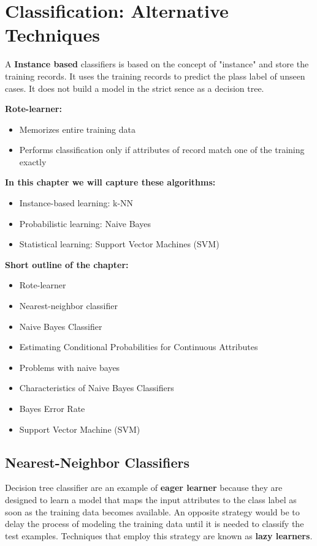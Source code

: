 \chapter{Classification: Alternative Techniques}
	
	A {\bf Instance based} classifiers is based on the concept of "instance" and store
	the training records. It uses the training records to predict the plass label
	of unseen cases. It does not build a model in the strict sence as a decision tree. 

	{\bf Rote-learner:}
	\begin{itemize}
		\item Memorizes entire training data
		\item Performs classification only if attributes of record match
		one of the training exactly
	\end{itemize}

	{\bf In this chapter we will capture these algorithms:} 
	\begin{itemize}
		\item Instance-based learning: k-NN
		\item Probabilistic learning: Naive Bayes
		\item Statistical learning: Support Vector Machines (SVM)
	\end{itemize}

	{\bf Short outline of the chapter:}

		\begin{itemize}
			\item Rote-learner
			\item Nearest-neighbor classifier
			\item Naive Bayes Classifier
			\item Estimating Conditional Probabilities for Continuous Attributes
			\item Problems with naive bayes
			\item Characteristics of Naive Bayes Classifiers
			\item Bayes Error Rate
			\item Support Vector Machine (SVM)
		\end{itemize}

	\clearpage
	\section{Nearest-Neighbor Classifiers}

		Decision tree classifier are an example of {\bf eager learner} because
		they are designed to learn a model that maps the input attributes to 
		the class label as soon as the training data becomes available. 
		An opposite strategy would be to delay the process of modeling the 
		training data until it is needed to classify the test examples.
		Techniques that employ this strategy are known as {\bf lazy learners}.

